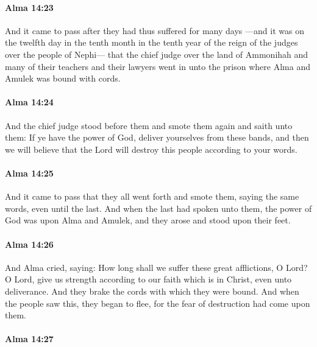 		\paragraph{Alma 14:23} %
			\label{ALMA-14-23}

			And it came to pass after they had thus suffered for many days
			---and it was on the twelfth day in the tenth month in the tenth year
			of the reign of the judges over the people of Nephi---
			that the chief judge over the land of Ammonihah
			and many of their teachers and their lawyers went in unto the prison
			where Alma and Amulek was bound with cords.

		\paragraph{Alma 14:24} %
			\label{ALMA-14-24}

			And the chief judge stood before them and smote them again
			and saith unto them:
			If ye have the power of God,
			deliver yourselves from these bands,
			and then we will believe
			that the Lord will destroy this people according to your words.

		\paragraph{Alma 14:25} %
			\label{ALMA-14-25}

			And it came to pass that they all went forth and smote them,
			saying the same words, even until the last.
			And when the last had spoken unto them,
			the power of God was upon Alma and Amulek,
			and they arose and stood upon their feet.

		\paragraph{Alma 14:26} %
			\label{ALMA-14-26}

			And Alma cried, saying:
			How long shall we suffer these great afflictions, O Lord?
			O Lord, give us strength
			according to our faith which is in Christ,
			even unto deliverance.
			And they brake the cords with which they were bound.
			And when the people saw this, they began to flee,
			for the fear of destruction had come upon them.

		\paragraph{Alma 14:27} %
			\label{ALMA-14-27}

